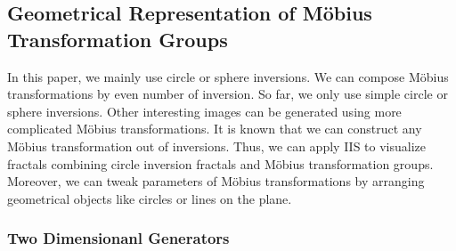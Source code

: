 
\subsection{Geometrical Representation of M\"obius Transformation Groups}


In this paper, we mainly use circle or sphere inversions.
We can compose M\"obius transformations by even number of
inversion.
So far, we only use simple circle or sphere inversions.
Other interesting images can be generated using more
complicated M\"obius transformations.
It is known that we can construct any M\"obius transformation out of
inversions.
Thus, we can apply IIS to visualize fractals combining circle inversion
fractals and M\"obius transformation groups.
Moreover, we can tweak parameters of M\"obius transformations by
arranging geometrical objects like circles or lines on the plane.

\subsubsection{Two Dimensionanl Generators}

